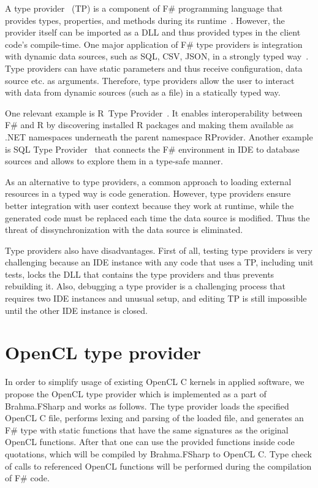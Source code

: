 \documentclass[sigplan,review]{acmart}\settopmatter{printfolios=true}
\begin{document}
A type provider~\cite{syme2012strongly} (TP) is a component of F\# programming language that provides types, properties, and methods during its runtime~\cite{TypeProviders}. However, the provider itself can be imported as a DLL and thus provided types in the client code's compile-time. One major application of F\# type providers is integration with dynamic data sources, such as SQL, CSV, JSON, in a strongly typed way~\cite{FSharpData}. Type providers can have static parameters and thus receive configuration, data source etc. as arguments. Therefore, type providers allow the user to interact with data from dynamic sources (such as a file) in a statically typed way.

One relevant example is R~Type Provider~\cite{R_TP}. It enables interoperability between F\# and R by discovering installed R packages and making them available as .NET namespaces underneath the parent namespace RProvider. Another example is SQL Type Provider~\cite{SQL_TP} that connects the F\# environment in IDE to database sources and allows to explore them in a type-safe manner.

As an alternative to type providers, a common approach to loading external resources in a typed way is code generation. However, type providers ensure better integration with user context because they work at runtime, while the generated code must be replaced each time the data source is modified. Thus the threat of dissynchronization with the data source is eliminated.

Type providers also have disadvantages. First of all, testing type providers is very challenging because an IDE instance with any code that uses a TP, including unit tests, locks the DLL that contains the type providers and thus prevents rebuilding it. Also, debugging a type provider is a challenging process that requires two IDE instances and unusual setup, and editing TP is still impossible until the other IDE instance is closed.

\section{OpenCL type provider}

In order to simplify usage of existing OpenCL C kernels in applied software, we propose the OpenCL type provider which is implemented as a part of Brahma.FSharp and works as follows. 
The type provider loads the specified OpenCL C file, performs lexing and parsing of the loaded file, and generates an F\# type with static functions that have the same signatures as the original OpenCL functions.
After that one can use the provided functions inside code quotations, which will be compiled by Brahma.FSharp to OpenCL C. Type check of calls to referenced OpenCL functions will be performed during the compilation of F\# code.
\end{document}
